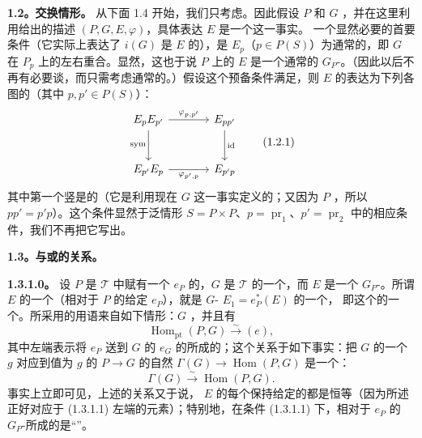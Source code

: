 \textbf{1.2。交换情形。} 从下面 1.4 开始，我们只考虑。因此假设 $P$ 和 $G$ ，并在这里利用给出的描述 $(P,G,E,\varphi)$，具体表达 $E$ 是一个这一事实。
一个显然必要的首要条件（它实际上表达了 $i(G)$ 是 $E$ 的），是 $E_p$（$p\in P(S)$）为通常的，即 $G$ 在 $P_p$ 上的左右重合。显然，这也于说 $P$ 上的 $E$ 是一个通常的 $G_P$-。（因此以后不再有必要谈，而只需考虑通常的。）假设这个预备条件满足，则 $E$ 的表达为下列各图的（其中 $p,p'\in P(S)$）：
\[
\begin{tikzcd}[column sep=large,row sep=large]
E_pE_{p'}\arrow[r,"{\varphi_{p,p'}}"]\arrow[d,"\mathrm{sym}"'] & E_{pp'}\arrow[d,"\mathrm{id}"]\\
E_{p'}E_p\arrow[r,"{\varphi_{p',p}}"'] & E_{p'p}
\end{tikzcd}
\tag{1.2.1}
\]
其中第一个竖是的（它是利用现在 $G$ 这一事实定义的；又因为 $P$ ，所以 $pp'=p'p$）。这个条件显然于泛情形 $S=P\times P$、$p=\operatorname{pr}_1$、$p'=\operatorname{pr}_2$ 中的相应条件，我们不再把它写出。

\textbf{1.3。与或的关系。}

\textbf{1.3.1.0。} 设 $P$ 是 $\mathcal T$ 中赋有一个 $e_P$ 的，$G$ 是 $\mathcal T$ 的一个，而 $E$ 是一个 $G_P$-。所谓 $E$ 的一个（相对于 $P$ 的给定 $e_P$），就是 $G$- $E_1=e_P^*(E)$ 的一个，
即这个的一个。所采用的用语来自如下情形：$G$ ，并且有
\[
\operatorname{Hom}_{\mathrm{pt}}(P,G)\xrightarrow{\sim}(e),
\tag{1.3.1.1}
\]
其中左端表示将 $e_P$ 送到 $G$ 的 $e_G$ 的所成的；这个关系于如下事实：把 $G$ 的一个 $g$ 对应到值为 $g$ 的 $P\to G$ 的自然 $\Gamma(G)\to\operatorname{Hom}(P,G)$ 是一个：
\[
\Gamma(G)\xrightarrow{\sim}\operatorname{Hom}(P,G).
\tag{1.3.1.2}
\]
事实上立即可见，上述的关系又于说， $E$ 的每个保持给定的都是恒等（因为所述正好对应于 (1.3.1.1) 左端的元素）；特别地，在条件 (1.3.1.1) 下，相对于 $e_P$ 的 $G_P$-所成的是“”。

